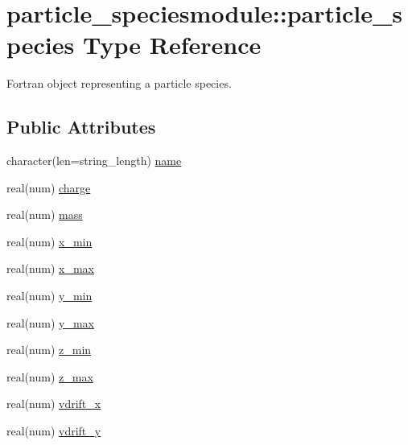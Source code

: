 \hypertarget{structparticle__speciesmodule_1_1particle__species}{}\section{particle\+\_\+speciesmodule\+:\+:particle\+\_\+species Type Reference}
\label{structparticle__speciesmodule_1_1particle__species}


Fortran object representing a particle species.  


\subsection*{Public Attributes}
\begin{DoxyCompactItemize}
\item 
character(len=string\+\_\+length) \hyperlink{structparticle__speciesmodule_1_1particle__species_aa1e042e7e07eb5fbf85a87e3fde7e325}{name}
\item 
real(num) \hyperlink{structparticle__speciesmodule_1_1particle__species_a05f3c94b07c83bf5dfa7db9f240866aa}{charge}
\item 
real(num) \hyperlink{structparticle__speciesmodule_1_1particle__species_a06cae9ba8f87d3cfcfd1df4b7b2a31d6}{mass}
\item 
real(num) \hyperlink{structparticle__speciesmodule_1_1particle__species_a21d37650e80b2dba525e21c357f525c2}{x\+\_\+min}
\item 
real(num) \hyperlink{structparticle__speciesmodule_1_1particle__species_a957bf2cb43e37c39d47f5f3ade56df35}{x\+\_\+max}
\item 
real(num) \hyperlink{structparticle__speciesmodule_1_1particle__species_ae996ec1f900c2607ad220c0a1813487d}{y\+\_\+min}
\item 
real(num) \hyperlink{structparticle__speciesmodule_1_1particle__species_a341bde0930d6c60b000e1d0aa1d1c61e}{y\+\_\+max}
\item 
real(num) \hyperlink{structparticle__speciesmodule_1_1particle__species_ac0dc85e67cc9339413fd205f454ca487}{z\+\_\+min}
\item 
real(num) \hyperlink{structparticle__speciesmodule_1_1particle__species_a71d56c3b0cdb8b96056560d918181454}{z\+\_\+max}
\item 
real(num) \hyperlink{structparticle__speciesmodule_1_1particle__species_a85b74bc5600957f431334c9385b52658}{vdrift\+\_\+x}
\item 
real(num) \hyperlink{structparticle__speciesmodule_1_1particle__species_ad0b494647be9cce68aa240914b853e24}{vdrift\+\_\+y}

\end{DoxyCompactItemize}
